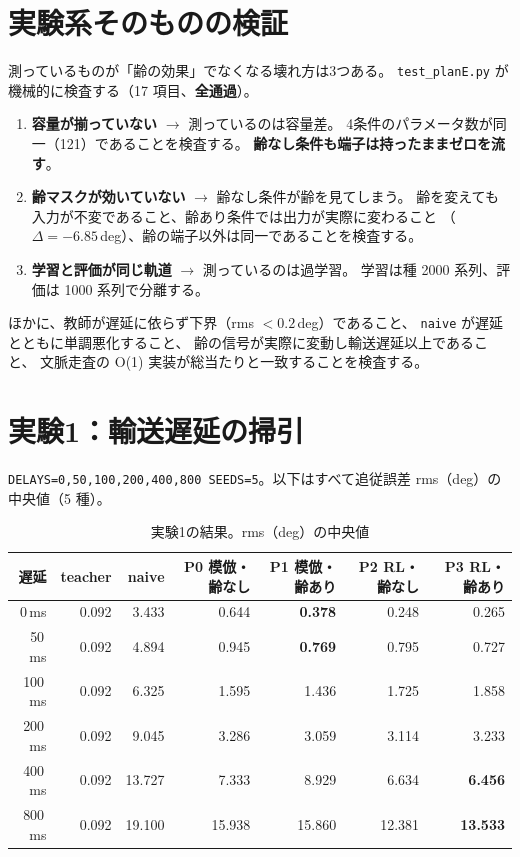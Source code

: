 \documentclass[11pt,a4paper]{article}
\newcommand{\code}[1]{\texttt{#1}}
\newcommand{\prob}[1]{\textbf{\textcolor{red!55!black}{#1}}}
\newcommand{\keyp}[1]{\textbf{\textcolor{blue!45!black}{#1}}}
\begin{document}
\section{実験系そのものの検証}

測っているものが「齢の効果」でなくなる壊れ方は3つある。
\code{test\_planE.py} が機械的に検査する（17 項目、\keyp{全通過}）。

\begin{enumerate}[leftmargin=1.8em,itemsep=3pt]
  \item \prob{容量が揃っていない} $\to$ 測っているのは容量差。
        4条件のパラメータ数が同一（121）であることを検査する。
        \keyp{齢なし条件も端子は持ったままゼロを流す}。
  \item \prob{齢マスクが効いていない} $\to$ 齢なし条件が齢を見てしまう。
        齢を変えても入力が不変であること、齢あり条件では出力が実際に変わること
        （$\Delta=-6.85$\,deg）、齢の端子以外は同一であることを検査する。
  \item \prob{学習と評価が同じ軌道} $\to$ 測っているのは過学習。
        学習は種 2000 系列、評価は 1000 系列で分離する。
\end{enumerate}

\noindent
ほかに、教師が遅延に依らず下界（rms $<0.2$\,deg）であること、
\code{naive} が遅延とともに単調悪化すること、
齢の信号が実際に変動し輸送遅延以上であること、
文脈走査の O(1) 実装が総当たりと一致することを検査する。

\section{実験1：輸送遅延の掃引}

\code{DELAYS=0,50,100,200,400,800 SEEDS=5}。以下はすべて追従誤差 rms（deg）の中央値（5 種）。

\begin{table}[htbp]
\centering
\small
\caption{実験1の結果。rms（deg）の中央値}
\label{tab:e1}
\begin{tabular}{@{}r rr rr rr@{}}
\toprule
\textbf{遅延} & \textbf{teacher} & \textbf{naive} &
\textbf{P0 模倣・齢なし} & \textbf{P1 模倣・齢あり} &
\textbf{P2 RL・齢なし} & \textbf{P3 RL・齢あり} \\
\midrule
0\,ms   & 0.092 & 3.433 & 0.644 & \textbf{0.378} & 0.248 & 0.265 \\
50\,ms  & 0.092 & 4.894 & 0.945 & \textbf{0.769} & 0.795 & 0.727 \\
100\,ms & 0.092 & 6.325 & 1.595 & 1.436 & 1.725 & 1.858 \\
200\,ms & 0.092 & 9.045 & 3.286 & 3.059 & 3.114 & 3.233 \\
400\,ms & 0.092 & 13.727 & 7.333 & 8.929 & 6.634 & \textbf{6.456} \\
800\,ms & 0.092 & 19.100 & 15.938 & 15.860 & 12.381 & \textbf{13.533} \\
\bottomrule
\end{tabular}
\end{table}
\end{document}

